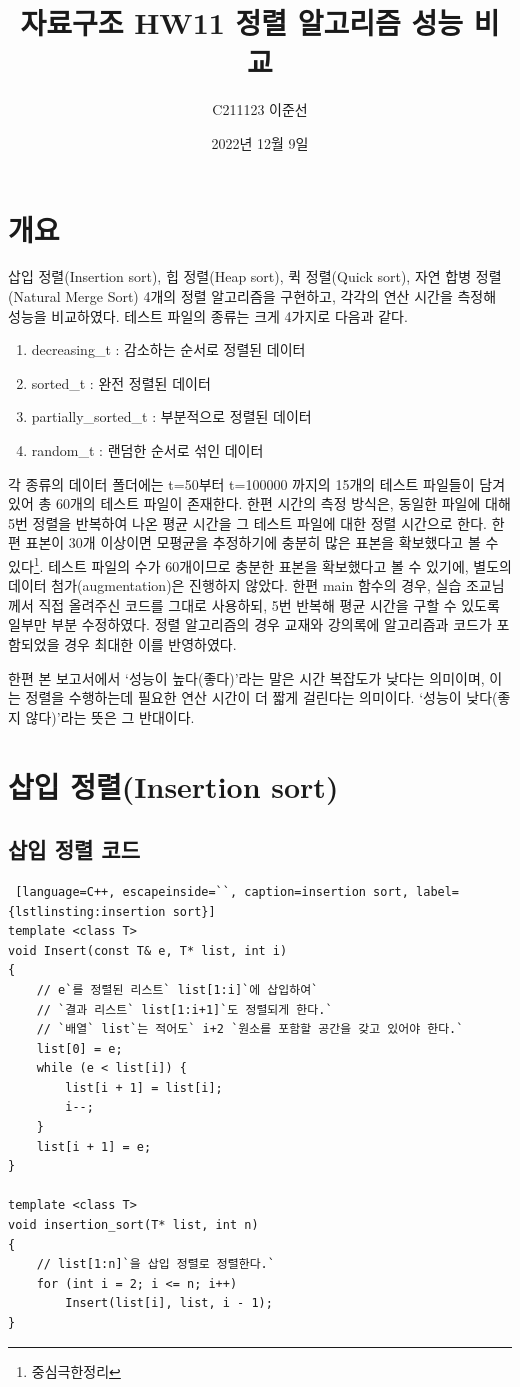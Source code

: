 \documentclass{article}
\title{자료구조 HW11 정렬 알고리즘 성능 비교}
\author{C211123 이준선}
\date{2022년 12월 9일}
\begin{document}
\maketitle
\tableofcontents
\listoffigures
\lstlistoflistings

\section{개요}
삽입 정렬(Insertion sort), 힙 정렬(Heap sort), 퀵 정렬(Quick sort), 자연 합병 정렬(Natural Merge Sort) 4개의 정렬 알고리즘을 구현하고, 각각의 연산 시간을 측정해 성능을 비교하였다. 테스트 파일의 종류는 크게 4가지로 다음과 같다.
\begin{enumerate}
    \item decreasing\_t : 감소하는 순서로 정렬된 데이터
    \item sorted\_t : 완전 정렬된 데이터
    \item partially\_sorted\_t : 부분적으로 정렬된 데이터
    \item random\_t : 랜덤한 순서로 섞인 데이터
\end{enumerate}

각 종류의 데이터 폴더에는 t=50부터 t=100000 까지의 15개의 테스트 파일들이 담겨 있어 총 60개의 테스트 파일이 존재한다. 한편 시간의 측정 방식은, 동일한 파일에 대해 5번 정렬을 반복하여 나온 평균 시간을 그 테스트 파일에 대한 정렬 시간으로 한다. 한편 표본이 30개 이상이면 모평균을 추정하기에 충분히 많은 표본을 확보했다고 볼 수 있다\footnote{중심극한정리}. 테스트 파일의 수가 60개이므로 충분한 표본을 확보했다고 볼 수 있기에, 별도의 데이터 첨가(augmentation)은 진행하지 않았다. 한편 main 함수의 경우, 실습 조교님께서 직접 올려주신 코드를 그대로 사용하되, 5번 반복해 평균 시간을 구할 수 있도록 일부만 부분 수정하였다. 정렬 알고리즘의 경우 교재와 강의록에 알고리즘과 코드가 포함되었을 경우 최대한 이를 반영하였다.

한편 본 보고서에서 `성능이 높다(좋다)'라는 말은 시간 복잡도가 낮다는 의미이며, 이는 정렬을 수행하는데 필요한 연산 시간이 더 짧게 걸린다는 의미이다. `성능이 낮다(좋지 않다)'라는 뜻은 그 반대이다.

\section{삽입 정렬(Insertion sort)}
\subsection{삽입 정렬 코드}
\begin{lstlisting} [language=C++, escapeinside=``, caption=insertion sort, label={lstlinsting:insertion sort}]
template <class T>
void Insert(const T& e, T* list, int i)
{
	// e`를 정렬된 리스트` list[1:i]`에 삽입하여`
	// `결과 리스트` list[1:i+1]`도 정렬되게 한다.`
	// `배열` list`는 적어도` i+2 `원소를 포함할 공간을 갖고 있어야 한다.`
	list[0] = e;
	while (e < list[i]) {
		list[i + 1] = list[i];
		i--;
	}
	list[i + 1] = e;
}

template <class T>
void insertion_sort(T* list, int n)
{
	// list[1:n]`을 삽입 정렬로 정렬한다.`
	for (int i = 2; i <= n; i++)
		Insert(list[i], list, i - 1);
}
\end{lstlisting}
\end{document}
